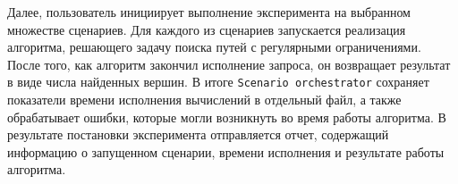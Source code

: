 Далее, пользователь инициирует выполнение эксперимента на выбранном множестве сценариев. Для каждого из сценариев запускается реализация алгоритма, решающего задачу поиска путей с регулярными ограничениями. После того, как алгоритм закончил исполнение запроса, он возвращает результат в виде числа найденных вершин. В итоге \verb|Scenario orchestrator| сохраняет показатели времени исполнения вычислений в отдельный файл, а также обрабатывает ошибки, которые могли возникнуть во время работы алгоритма. В результате постановки эксперимента отправляется отчет, содержащий информацию о запущенном сценарии, времени исполнения и результате работы алгоритма.
